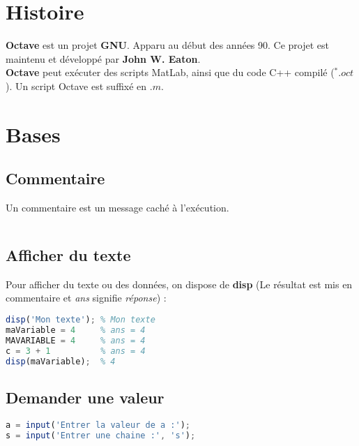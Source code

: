 



    \section{Histoire}
        \textbf{Octave} est un projet \textbf{GNU}. Apparu au début des années 90. Ce projet est maintenu et développé par \textbf{John W. Eaton}.\\
        \textbf{Octave} peut exécuter des scripts MatLab, ainsi que du code C++ compilé ($^*.oct$). Un script Octave est suffixé en $.m$.
    \section{Bases}
        \subsection{Commentaire}
            Un commentaire est un message caché à l'exécution.
            \begin{lstlisting}[language=Octave]
%Ceci est un commentaire
            \end{lstlisting}
        \subsection{Afficher du texte}
            Pour afficher du texte ou des données, on dispose de \textbf{disp} (Le résultat est mis en commentaire et \textit{ans} signifie \textit{réponse}) :
            \begin{lstlisting}[language=Octave]
disp('Mon texte'); % Mon texte
maVariable = 4     % ans = 4
MAVARIABLE = 4     % ans = 4
c = 3 + 1          % ans = 4
disp(maVariable);  % 4
            \end{lstlisting}
        \subsection{Demander une valeur}
            \begin{lstlisting}[language=Octave]
a = input('Entrer la valeur de a :');
s = input('Entrer une chaine :', 's');
            \end{lstlisting}
